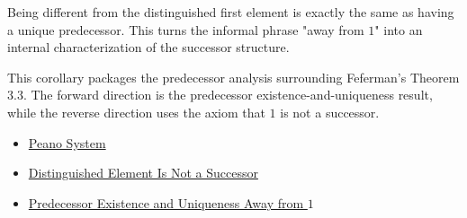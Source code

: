 \begin{remark*}[Interpretation]
Being different from the distinguished first element is exactly the same as
having a unique predecessor. This turns the informal phrase "away from $1$"
into an internal characterization of the successor structure.
\end{remark*}

\begin{remark*}
This corollary packages the predecessor analysis surrounding Feferman's
Theorem 3.3. The forward direction is the predecessor
existence-and-uniqueness result, while the reverse direction uses the axiom
that $1$ is not a successor. \citet{FefermanNumberSystems1964}
\end{remark*}

\begin{dependencies}
\begin{itemize}
  \item \hyperref[def:peano-system]{Peano System}
  \item \hyperref[ax:peano-base-not-successor]{Distinguished Element Is Not a Successor}
  \item \hyperref[cor:predecessor-exists-unique-away-from-one]{Predecessor Existence and Uniqueness Away from $1$}
\end{itemize}
\end{dependencies}

